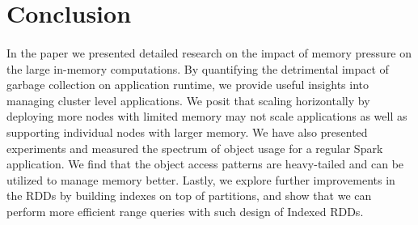 \section{Conclusion}
\label{sec:conclusion}
\paragraph{}
In the paper we presented detailed research on the impact of memory
pressure on the large in-memory computations. By quantifying the
detrimental impact of garbage collection on application runtime, we
provide useful insights into managing cluster level applications. We
posit that scaling horizontally by deploying more nodes with limited
memory may not scale applications as well as supporting individual nodes
with larger memory. We have also presented experiments and measured the
spectrum of object usage for a regular Spark application. We find that
the object access patterns are heavy-tailed and can be utilized to
manage memory better. Lastly, we explore further improvements in the
RDDs by building indexes on top of partitions, and show that we can
perform more efficient range queries with such design of Indexed RDDs.
